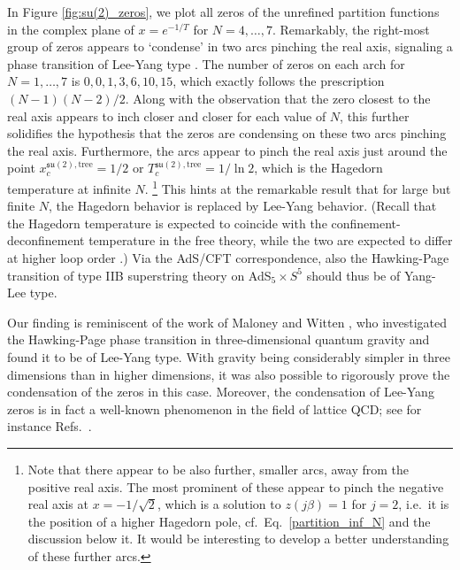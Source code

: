 \documentclass[a4paper,11pt]{article}
\begin{document}
In Figure \ref{fig:su(2)_zeros}, we plot all zeros of the unrefined partition functions in the complex plane of $x=e^{-1/T}$ for $N=4,\dotsc,7$. Remarkably, the right-most group of zeros appears to `condense' in two arcs pinching the real axis, signaling a phase transition of Lee-Yang type \cite{Yang:1952be}.
The number of zeros on each arch for $N=1,\dotsc,7$ is $0,0,1,3,6,10,15$, which exactly follows the prescription $(N-1)(N-2)/2$. Along with the observation that the zero closest to the real axis appears to inch closer and closer for each value of $N$, this further solidifies the hypothesis that the zeros are condensing on these two arcs pinching the real axis.
% 
Furthermore, the arcs appear to pinch the real axis just around the point $x^{\mathfrak{su}(2),\text{tree}}_c=1/2$ or $T_c^{\mathfrak{su}(2),\text{tree}}=1/\ln 2$, which is the Hagedorn temperature at infinite $N$.%
\footnote{Note that there appear to be also further, smaller arcs, away from the positive real axis. The most prominent of these appear to pinch the negative real axis at $x=-1/\sqrt{2}$, which is a solution to $z(j\beta)=1$ for $j=2$, i.e.\ it is the position of a higher Hagedorn pole, cf.\ Eq.\ \eqref{partition_inf_N} and the discussion below it. It would be interesting to develop a better understanding of these further arcs.}
This hints at the remarkable result that for large but finite $N$, the Hagedorn behavior is replaced by Lee-Yang behavior.
(Recall that the Hagedorn temperature is expected to coincide with the confinement-deconfinement temperature in the free theory, while the two are expected to differ at higher loop order \cite{Aharony:2003sx}.)
Via the AdS/CFT correspondence, also the Hawking-Page transition of type IIB superstring theory on AdS${}_5\times S^5$ should thus be of Yang-Lee type.

Our finding is reminiscent of the work of Maloney and Witten \cite{Maloney:2007ud}, who investigated the Hawking-Page phase transition in three-dimensional quantum gravity and found it to be of Lee-Yang type. 
With gravity being considerably simpler in three dimensions than in higher dimensions, it was also possible to rigorously prove the condensation of the zeros in this case.
Moreover, the condensation of Lee-Yang zeros is in fact a well-known phenomenon in the field of lattice QCD; see for instance Refs.\ \cite{Nagata:2012tc,Nakamura:2013ska,Nagata:2014fra,Wakayama:2018wkc,Wakayama:2019hgz}.
\end{document}
